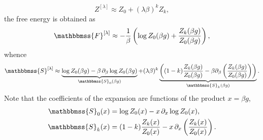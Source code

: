 \documentclass[aps,pra,floatfix,twocolumn,groupedaddress,superscriptaddress,nofootinbib,notitlepage,amsmath,amssymb,]{revtex4-1}
\begin{document}
\begin{widetext}
\begin{equation}
Z^{[\lambda]}\approx  Z_0+(\lambda\beta)^{k} Z_k,
\end{equation}
the free energy is obtained as
\begin{equation}
\mathbbmss{F}^{[\lambda]}\approx  -\frac{1}{\beta}\left(\log Z_0(\beta g)+\frac{Z_k(\beta g)}{Z_0(\beta g)}\right),
\end{equation}
whence
\begin{equation}
\mathbbmss{S}^{[\lambda]}\approx  \underbrace{\log Z_0(\beta g)-\beta\,\partial_\beta\log Z_0(\beta g)}_{\mathbbmss{S}_0(\beta g)} + (\lambda\beta)^k\underbrace{\left((1-k)\frac{Z_k(\beta g)}{Z_0(\beta g)}-\beta\partial_\beta\left(\frac{Z_k(\beta g)}{Z_0(\beta g)}\right)\right)}_{\mathbbmss{S}_k(\beta g)}.
\end{equation}
Note that the coefficients of the expansion are functions of the product $x=\beta g$,
\begin{align}
\label{appBent}
\mathbbmss{S}_0(x)&=\log Z_0(x)-x\,\partial_x\log Z_0(x),\\
\mathbbmss{S}_k(x)&=(1-k)\frac{Z_k(x)}{Z_0(x)}-x\,\partial_x\left(\frac{Z_k(x)}{Z_0(x)}\right).
\end{align}

\twocolumngrid
\end{widetext}

\end{document}
